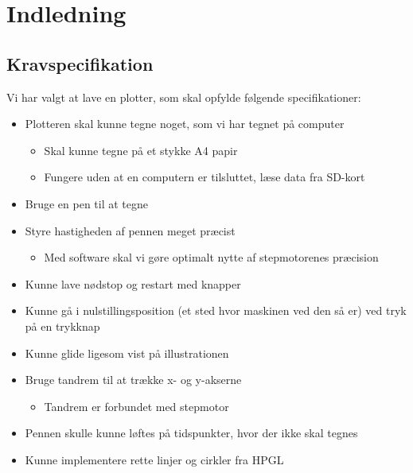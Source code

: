\chapter{Indledning}


\lipsum

\lipsum

\section{Kravspecifikation}

Vi har valgt at lave en plotter, som skal opfylde følgende specifikationer:
\begin{itemize}
\item Plotteren skal kunne tegne noget, som vi har tegnet på computer
\begin{itemize}
\item Skal kunne tegne på et stykke A4 papir
\item Fungere uden at en computern er tilsluttet, læse data fra SD-kort
\end{itemize}
\item Bruge en pen til at tegne
\item Styre hastigheden af pennen meget præcist
\begin{itemize}
\item Med software skal vi gøre optimalt nytte af stepmotorenes præcision
\end{itemize}
\item Kunne lave nødstop og restart med knapper
\item Kunne gå i nulstillingsposition (et sted hvor maskinen ved den så er) ved tryk på en trykknap
\item Kunne glide ligesom vist på illustrationen
\item Bruge tandrem til at trække x- og y-akserne
\begin{itemize}
\item Tandrem er forbundet med stepmotor
\end{itemize}
\item Pennen skulle kunne løftes på tidspunkter, hvor der ikke skal tegnes
\item Kunne implementere rette linjer og cirkler fra HPGL
\end{itemize}

